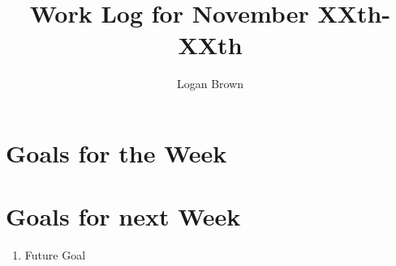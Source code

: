 

\title{Work Log for November XXth-XXth}
\author{Logan Brown}


\maketitle


\section{Goals for the Week}




\section{Goals for next Week}
\begin{enumerate}
\item Future Goal
\end{enumerate}



